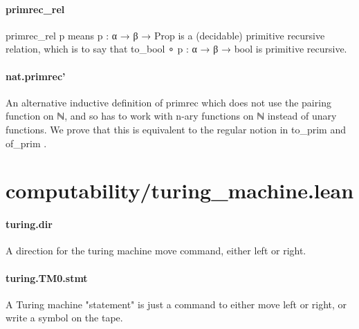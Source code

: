 \documentclass{article}
\begin{document}
\paragraph{primrec\_rel}
\par
\colorbox[RGB]{253,246,227}{{{{\color[RGB]{101, 123, 131} primrec\_rel p }}}} means 
\colorbox[RGB]{253,246,227}{{{{\color[RGB]{101, 123, 131} p : α  }}}{{{\color[RGB]{133, 153, 0} → }}}{{{\color[RGB]{101, 123, 131}  β  }}}{{{\color[RGB]{133, 153, 0} → }}}{{{\color[RGB]{101, 123, 131}   }}}{{{\color[RGB]{38, 139, 210} Prop }}}} is a (decidable)
primitive recursive relation, which is to say that
\colorbox[RGB]{253,246,227}{{{{\color[RGB]{101, 123, 131} to\_bool ∘ p : α  }}}{{{\color[RGB]{133, 153, 0} → }}}{{{\color[RGB]{101, 123, 131}  β  }}}{{{\color[RGB]{133, 153, 0} → }}}{{{\color[RGB]{101, 123, 131}  bool }}}} is primitive recursive.
\paragraph{nat.primrec'}
\par
An alternative inductive definition of 
\colorbox[RGB]{253,246,227}{{{{\color[RGB]{101, 123, 131} primrec }}}} which
does not use the pairing function on ℕ, and so has to
work with n-ary functions on ℕ instead of unary functions.
We prove that this is equivalent to the regular notion
in 
\colorbox[RGB]{253,246,227}{{{{\color[RGB]{101, 123, 131} to\_prim }}}} and 
\colorbox[RGB]{253,246,227}{{{{\color[RGB]{101, 123, 131} of\_prim }}}}.
\section{computability/turing\_machine.lean}\paragraph{turing.dir}
\par
A direction for the turing machine 
\colorbox[RGB]{253,246,227}{{{{\color[RGB]{101, 123, 131} move }}}} command, either
left or right.
\paragraph{turing.TM0.stmt}
\par
A Turing machine "statement" is just a command to either move
left or right, or write a symbol on the tape.
\end{document}
